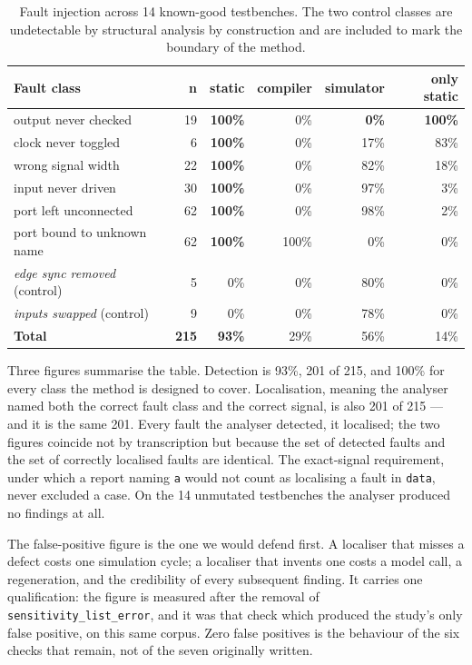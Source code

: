 \documentclass[11pt,a4paper,titlepage=false]{scrreprt}
\begin{document}
\begin{table}[H]
\centering
\small
\begin{tabular}{@{}l r r r r r@{}}
\toprule
\textbf{Fault class} & \textbf{n} & \textbf{static} & \textbf{compiler} & \textbf{simulator} & \textbf{only static} \\
\midrule
output never checked          & 19  & \textbf{100\%} & 0\%    & \textbf{0\%} & \textbf{100\%} \\
clock never toggled           & 6   & \textbf{100\%} & 0\%    & 17\%  & 83\% \\
wrong signal width            & 22  & \textbf{100\%} & 0\%    & 82\%  & 18\% \\
input never driven            & 30  & \textbf{100\%} & 0\%    & 97\%  & 3\%  \\
port left unconnected         & 62  & \textbf{100\%} & 0\%    & 98\%  & 2\%  \\
port bound to unknown name    & 62  & \textbf{100\%} & 100\%  & 0\%   & 0\%  \\
\textit{edge sync removed} (control)  & 5   & 0\%  & 0\% & 80\% & 0\% \\
\textit{inputs swapped} (control)     & 9   & 0\%  & 0\% & 78\% & 0\% \\
\midrule
\textbf{Total}                & \textbf{215} & \textbf{93\%} & 29\% & 56\% & 14\% \\
\bottomrule
\end{tabular}
\caption{Fault injection across 14 known-good testbenches. The two control classes are
undetectable by structural analysis by construction and are included to mark the boundary
of the method.}
\label{tab:injection}
\end{table}

Three figures summarise the table. Detection is 93\%, 201 of 215, and 100\% for every class
the method is designed to cover. Localisation, meaning the analyser named both the correct
fault class and the correct signal, is also 201 of 215 --- and it is the same 201. Every
fault the analyser detected, it localised; the two figures coincide not by transcription but
because the set of detected faults and the set of correctly localised faults are identical.
The exact-signal requirement, under which a report naming \texttt{a} would not count as
localising a fault in \texttt{data}, never excluded a case. On the 14 unmutated testbenches
the analyser produced no findings at all.

The false-positive figure is the one we would defend first. A localiser that misses a defect
costs one simulation cycle; a localiser that invents one costs a model call, a regeneration,
and the credibility of every subsequent finding. It carries one qualification: the figure is
measured after the removal of \texttt{sensitivity\_list\_error}, and it was that check which
produced the study's only false positive, on this same corpus. Zero false positives is the
behaviour of the six checks that remain, not of the seven originally written.
\end{document}
